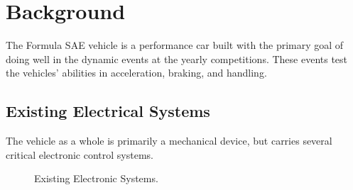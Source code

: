 %
%
%
%

\section{Background}

The Formula SAE vehicle is a performance car built with the primary goal of doing well in the dynamic events at the yearly competitions. These events test the vehicles' abilities in acceleration, braking, and handling.

\subsection{Existing Electrical Systems}

The vehicle as a whole is primarily a mechanical device, but carries several critical electronic control systems.

\begin{figure}[h!]
  \begin{center}
    \caption{\label{fig:qm/complexfunctions} Existing Electronic Systems.}
  \end{center}
\end{figure}

